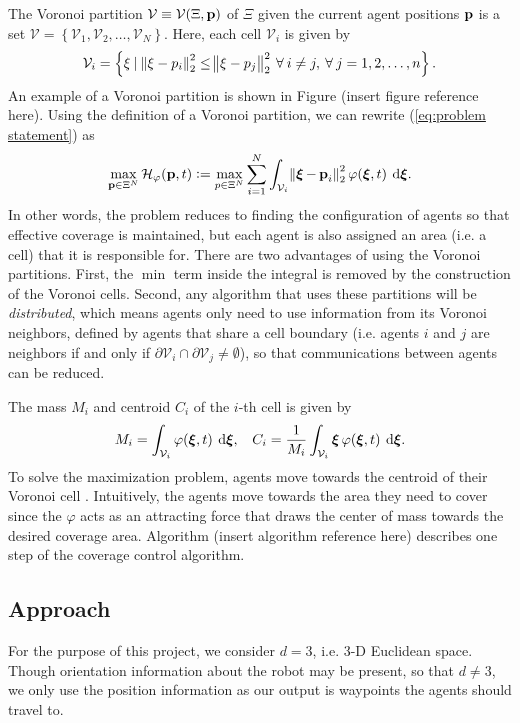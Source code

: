 \documentclass{article}
\DeclareMathOperator{\bxi}{\boldsymbol{\xi}}
\begin{document}
The Voronoi partition $\mathcal{V} \equiv \mathcal{V}(\Xi, \operatorname{\mathbf{p}})$ of $\Xi$ given the current agent positions $\operatorname{\mathbf{p}}$ is a set $\mathcal{V} = \left\{ \mathcal{V}_1, \mathcal{V}_2, \dots, \mathcal{V}_N \right\}$. Here, each cell $\mathcal{V}_i$ is given by 
\begin{equation*}
	\displaystyle \mathcal{V}_i = \left\{ \xi \: | \: \norm{\xi - p_i}^2_2 \leq \norm{\xi - p_j}^2_2 \: \forall \: i \neq j, \: \forall \: j = 1, 2, \dots, n \right\}.
\end{equation*}
An example of a Voronoi partition is shown in Figure (insert figure reference here). Using the definition of a Voronoi partition, we can rewrite (\ref{eq:problem statement}) as 
\begin{equation}
	\label{eq:rewritten coverage control}
	\displaystyle \max\limits_{\bp \in \Xi^N}{\mathcal{H}_{\varphi}(\bp, t)} := \max\limits_{p \in \Xi^N}\sum\limits_{i=1}^{N}{\int_{\mathcal{V}_i}{\norm{\bxi - \bp_i}^2_2 \varphi(\bxi, t)\: \dif \bxi}}.
\end{equation}
In other words, the problem reduces to finding the configuration of agents so that effective coverage is maintained, but each agent is also assigned an area (i.e. a cell) that it is responsible for. There are two advantages of using the Voronoi partitions. First, the $\min$ term inside the integral is removed by the construction of the Voronoi cells. Second, any algorithm that uses these partitions will be \textit{distributed}, which means agents only need to use information from its Voronoi neighbors, defined by agents that share a cell boundary (i.e. agents $i$ and $j$ are neighbors if and only if $\partial \mathcal{V}_i \cap \partial \mathcal{V}_j \neq \emptyset$), so that communications between agents can be reduced. 

The mass $M_i$ and centroid $C_i$ of the $i$-th cell is given by 
\begin{equation}
	\label{eq:mass, center of mass}
	\displaystyle M_i = \int_{\mathcal{V}_i}{\varphi(\bxi, t)\: \dif \bxi}, \:\:\:\: C_i = \frac{1}{M_i}\int_{\mathcal{V}_i}{\bxi \varphi(\bxi, t) \: \dif \bxi}.
\end{equation}
To solve the maximization problem, agents move towards the centroid of their Voronoi cell \cite{Cortes:2004}. Intuitively, the agents move towards the area they need to cover since the $\varphi$ acts as an attracting force that draws the center of mass towards the desired coverage area. Algorithm (insert algorithm reference here) describes one step of the coverage control algorithm. 
\subsection{Approach}
For the purpose of this project, we consider $d = 3$, i.e. 3-D Euclidean space. Though orientation information about the robot may be present, so that $d \neq 3$, we only use the position information as our output is waypoints the agents should travel to.
\end{document}
